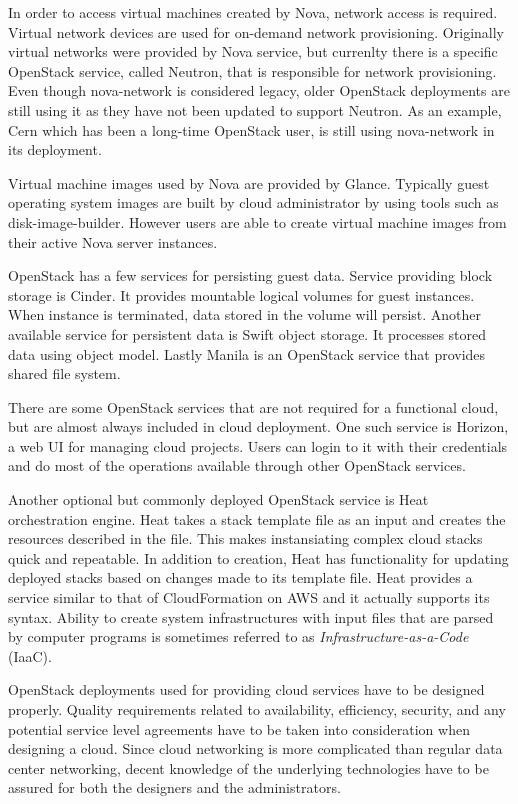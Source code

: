 In order to access virtual machines created by Nova, network access is
required. Virtual network devices are used for on-demand network provisioning.
Originally virtual networks were provided by Nova service, but currenlty there
is a specific OpenStack service, called Neutron, that is responsible for
network provisioning. Even though nova-network is considered legacy, older
OpenStack deployments are still using it as they have not been updated to
support Neutron. As an example, Cern which has been a long-time OpenStack user,
is still using nova-network in its deployment.

Virtual machine images used by Nova are provided by Glance. Typically guest
operating system images are built by cloud administrator by using tools such as
disk-image-builder. However users are able to create virtual machine images
from their active Nova server instances.

OpenStack has a few services for persisting guest data. Service providing block
storage is Cinder. It provides mountable logical volumes for guest instances.
When instance is terminated, data stored in the volume will persist. Another
available service for persistent data is Swift object storage. It processes
stored data using object model. Lastly Manila is an OpenStack service that
provides shared file system.

There are some OpenStack services that are not required for a functional cloud,
but are almost always included in cloud deployment. One such service is
Horizon, a web UI for managing cloud projects. Users can login to it with their
credentials and do most of the operations available through other OpenStack
services.

Another optional but commonly deployed OpenStack service is Heat orchestration
engine. Heat takes a stack template file as an input and creates the resources
described in the file. This makes instansiating complex cloud stacks quick and
repeatable. In addition to creation, Heat has functionality for updating
deployed stacks based on changes made to its template file. Heat provides a
service similar to that of CloudFormation on AWS and it actually supports its
syntax. Ability to create system infrastructures with input files that are
parsed by computer programs is sometimes referred to as
\textit{Infrastructure-as-a-Code} (IaaC).

OpenStack deployments used for providing cloud services have to be designed
properly. Quality requirements related to availability, efficiency, security,
and any potential service level agreements have to be taken into consideration
when designing a cloud. Since cloud networking is more complicated than regular
data center networking, decent knowledge of the underlying technologies have to
be assured for both the designers and the administrators.

